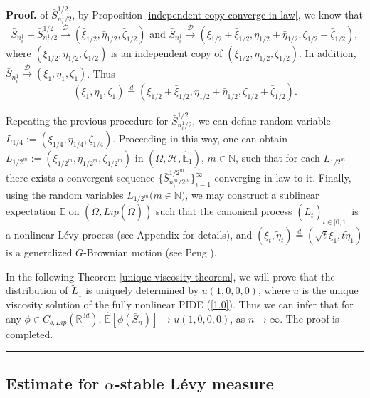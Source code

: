 \documentclass[a4paper,oneside,10pt]{article}%
\newenvironment{proof}[1][Proof]{\noindent \textbf{#1.} }{\  \rule{0.5em}{0.5em}}
\numberwithin{equation}{section}
\begin{document}
\begin{proof}
of $\bar{S}_{n_{i}^{1}/2}^{1/2}$, by Proposition
\ref{independent copy converge in law}, we know that
\[
\bar{S}_{n_{i}^{1}}-\bar{S}_{n_{i}^{1}/2}^{1/2}\overset{\mathcal{D}%
}{\rightarrow}(\bar{\xi}_{1/2},\bar{\eta}_{1/2},\bar{\zeta}_{1/2})\text{ \ and
\ }\bar{S}_{n_{i}^{1}}\overset{\mathcal{D}}{\rightarrow}(\xi_{1/2}+\bar{\xi
}_{1/2},\eta_{1/2}+\bar{\eta}_{1/2},\zeta_{1/2}+\bar{\zeta}_{1/2}),
\]
where $(\bar{\xi}_{1/2},\bar{\eta}_{1/2},\bar{\zeta}_{1/2})$ is an independent
copy of $(\xi_{1/2},\eta_{1/2},\zeta_{1/2})$. In addition, $\bar{S}_{n_{i}%
^{1}}\overset{\mathcal{D}}{\rightarrow}(\xi_{1},\eta_{1},\zeta_{1})$. Thus
\[
(\xi_{1},\eta_{1},\zeta_{1})\overset{d}{=}(\xi_{1/2}+\bar{\xi}_{1/2}%
,\eta_{1/2}+\bar{\eta}_{1/2},\zeta_{1/2}+\bar{\zeta}_{1/2}).
\]


Repeating the previous procedure for $\bar{S}_{n_{i}^{1}/2}^{1/2}$, we can
define random variable $L_{1/4}:=(\xi_{1/4},\eta_{1/4},\zeta_{1/4})$.
Proceeding in this way, one can obtain $L_{1/2^{m}}:=(\xi_{1/2^{m}}%
,\eta_{1/2^{m}},\zeta_{1/2^{m}})$ in $(\Omega,\mathcal{H},\mathbb{\hat{E}}%
_{1})$, $m\in \mathbb{N}$, such that for each $L_{1/2^{m}}$ there exists a
convergent sequence $\{ \bar{S}_{n_{i}^{m}/2^{m}}^{1/2^{m}}\}_{i=1}^{\infty}$
converging in law to it. Finally, using the random variables $L_{1/2^{m}}%
(m\in \mathbb{N)}$, we may construct a sublinear expectation $\mathbb{\tilde
{E}}$ on $(\tilde{\Omega},Lip(\tilde{\Omega}))$ such that the canonical
process $(\tilde{L}_{t})_{t\in \lbrack0,1]}$ is a nonlinear L\'{e}vy process
(see Appendix for details), and $(\tilde{\xi}_{t},\tilde{\eta}_{t})\overset
{d}{=}(\sqrt{t}\tilde{\xi}_{1},t\tilde{\eta}_{1})$ is a generalized
$G$-Brownian motion (see Peng \cite[Chapter 3]{P2010}).

In the following Theorem \ref{unique viscosity theorem}, we will prove that
the distribution of $\tilde{L}_{1}$ is uniquely determined by $u(1,0,0,0)$,
where $u$ is the unique viscosity solution of the fully nonlinear PIDE
(\ref{1.0}). Thus we can infer that for any $\phi \in C_{b,Lip}(\mathbb{R}%
^{3d})$, $\mathbb{\hat{E}}[\phi(\bar{S}_{n})]\rightarrow u(1,0,0,0)$, as
$n\rightarrow \infty$. The proof is completed.
\end{proof}

\subsection{Estimate for $\alpha$-stable L\'{e}vy measure}

\label{Section_Estimates for stable Levy measure}
\end{document}
